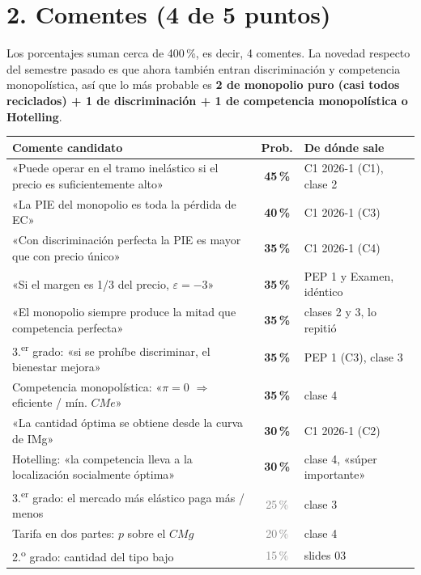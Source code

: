 \documentclass[11pt]{article}
\newcommand{\alta}[1]{\textbf{\textcolor{red!70!black}{#1}}}
\newcommand{\media}[1]{\textbf{\textcolor{orange!80!black}{#1}}}
\newcommand{\baja}[1]{\textcolor{gray}{#1}}
\begin{document}
\section*{2. Comentes (4 de 5 puntos)}

Los porcentajes suman cerca de 400\,\%, es decir, 4 comentes. La novedad respecto del semestre pasado es que ahora también entran discriminación y competencia monopolística, así que lo más probable es \textbf{2 de monopolio puro (casi todos reciclados) + 1 de discriminación + 1 de competencia monopolística o Hotelling}.

\begin{center}
\renewcommand{\arraystretch}{1.25}
\begin{tabularx}{\textwidth}{@{}Xcl@{}}
\toprule
Comente candidato & Prob. & De dónde sale \\
\midrule
«Puede operar en el tramo inelástico si el precio es suficientemente alto» & \alta{45\,\%} & C1 2026-1 (C1), clase 2 \\
«La PIE del monopolio es toda la pérdida de EC» & \media{40\,\%} & C1 2026-1 (C3) \\
«Con discriminación perfecta la PIE es mayor que con precio único» & \media{35\,\%} & C1 2026-1 (C4) \\
«Si el margen es 1/3 del precio, $\varepsilon = -3$» & \media{35\,\%} & PEP 1 y Examen, idéntico \\
«El monopolio siempre produce la mitad que competencia perfecta» & \media{35\,\%} & clases 2 y 3, lo repitió \\
3.\textsuperscript{er} grado: «si se prohíbe discriminar, el bienestar mejora» & \media{35\,\%} & PEP 1 (C3), clase 3 \\
Competencia monopolística: «$\pi = 0$ $\Rightarrow$ eficiente / mín. $CMe$» & \media{35\,\%} & clase 4 \\
«La cantidad óptima se obtiene desde la curva de IMg» & \media{30\,\%} & C1 2026-1 (C2) \\
Hotelling: «la competencia lleva a la localización socialmente óptima» & \media{30\,\%} & clase 4, «súper importante» \\
3.\textsuperscript{er} grado: el mercado más elástico paga más / menos & \baja{25\,\%} & clase 3 \\
Tarifa en dos partes: $p$ sobre el $CMg$ & \baja{20\,\%} & clase 4 \\
2.\textsuperscript{o} grado: cantidad del tipo bajo & \baja{15\,\%} & slides 03 \\
\bottomrule
\end{tabularx}
\end{center}
\end{document}
